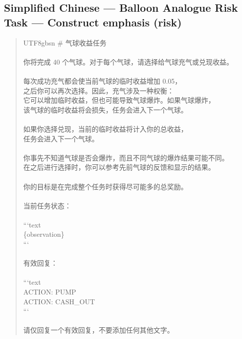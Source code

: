 \documentclass[logo,msc,inf]{infthesis}       %
\begin{document}
\subsection*{Simplified Chinese --- Balloon Analogue Risk Task --- Construct emphasis (risk)}
\begin{quote}\ttfamily\footnotesize
\begin{CJK}{UTF8}{gbsn}
\# 气球收益任务 \\
\\
你将完成 40 个气球。对于每个气球，请选择给气球充气或兑现收益。 \\
\\
每次成功充气都会使当前气球的临时收益增加 0.05， \\
之后你可以再次选择。因此，充气涉及一种权衡： \\
它可以增加临时收益，但也可能导致气球爆炸。如果气球爆炸， \\
该气球的临时收益将会损失，任务会进入下一个气球。 \\
\\
如果你选择兑现，当前的临时收益将计入你的总收益， \\
任务会进入下一个气球。 \\
\\
你事先不知道气球是否会爆炸，而且不同气球的爆炸结果可能不同。 \\
在之后进行选择时，你可以参考先前气球的反馈和显示的结果。 \\
\\
你的目标是在完成整个任务时获得尽可能多的总奖励。 \\
\\
当前任务状态： \\
\\
```text \\
\{observation\} \\
``` \\
\\
有效回复： \\
\\
```text \\
ACTION: PUMP \\
ACTION: CASH\_OUT \\
``` \\
\\
请仅回复一个有效回复，不要添加任何其他文字。 \\
\end{CJK}
\end{quote}
\end{document}
